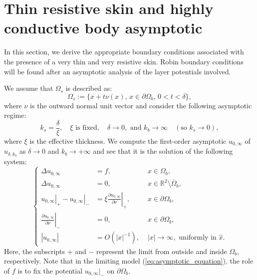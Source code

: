 \documentclass[final]{siamltex}
\numberwithin{equation}{section}
\numberwithin{figure}{section}
\numberwithin{table}{section}
\begin{document}
\section{Thin resistive skin and highly conductive body asymptotic}

\label{sub:BC-derivation}


In this section,  we derive the appropriate boundary conditions
associated with the presence of a very thin and very resistive
skin. Robin boundary conditions will be found after an asymptotic
analysis of the layer potentials involved.

We assume that $\Omega_{s}$ is described as:
\[
\Omega_{s}:=\big\{ x +t\nu(x),\,
x\in\partial\Omega_{b},\,0<t<\delta\big\},
\]
 where $\nu$ is the outward normal unit vector and consider the following asymptotic regime:
\begin{equation} \label{assumpk}
k_s = \frac{\delta}{\xi}, \quad \xi \mbox{ is fixed}, \quad
\delta\rightarrow0, \mbox{ and }k_{b}\rightarrow\infty \quad
(\mbox{so } k_s \rightarrow 0),
\end{equation}
where $\xi$ is the effective thickness. We compute the first-order
asymptotic $u_{0,\infty}$ of $u_{\delta,k_b}$ as $\delta
\rightarrow 0$ and $k_b\rightarrow +\infty$ and see that it is the
solution of the following system:
\begin{equation}
\left\{ \begin{alignedat}{2}\Delta u_{0,\infty} & ={f}, & \,\, x\in\Omega_{b},\\
\Delta u_{0,\infty} & =0, & \,\, x\in\mathbb{R}^{2}\setminus\overline{\Omega}_{b},\\
\left.u_{0,\infty}\right|_{+}-\left.u_{0,\infty}\right|_{-} & =\xi\left.\frac{\partial u_{0,\infty}}{\partial\nu}\right|_{+}, & \,\, x\in\partial\Omega_{b},\\
\left.\frac{\partial u_{0,\infty}}{\partial\nu}\right|_{-} & =0, & \,\, x\in \partial \Omega_{b},\\
\left|u_{0,\infty}\right| & = {O}(\left|x\right|^{-1}), &
\,\,\left|x\right|\rightarrow\infty,\text{ uniformly in }\hat{x}.
\end{alignedat}
\right.\label{eq:asymptotic_equation}
\end{equation}
Here, the subscripts $+$ and $-$ represent the limit from outside
and inside $\Omega_b$, respectively.  Note that in the limiting
model (\ref{eq:asymptotic_equation}), the role of $f$ is to fix
the potential $ u_{0,\infty} \big|_{-}$ on $\partial \Omega_{b}$.
\end{document}
